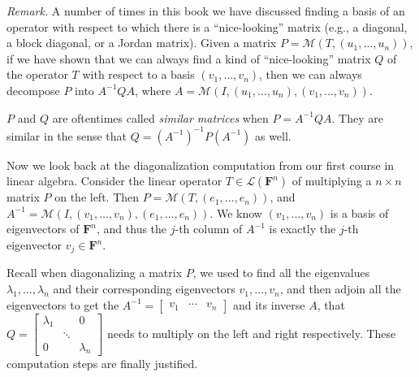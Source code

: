 \documentclass[11pt]{article}
\newcommand{\rmk}{\noindent\textit{Remark. }}
\newcommand{\df}[1]{\textit{\textsf{#1}}}
\newcommand{\F}{\mathbf{F}}
\newcommand{\M}{\mathcal{M}}
\begin{document}
    \rmk A number of times in this book we have discussed finding a basis of an operator with respect to which there is a ``nice-looking'' matrix (e.g., a diagonal, a block diagonal, or a Jordan matrix). Given a matrix $P = \M(T,(u_1,\dots,u_n))$, if we have shown that we can always find a kind of ``nice-looking'' matrix $Q$ of the operator $T$ with respect to a basis $(v_1,\dots,v_n)$, then we can always decompose $P$ into $A^{-1}QA$, where $A = \M(I,(u_1,\dots,u_n),(v_1,\dots,v_n))$.

    $P$ and $Q$ are oftentimes called \df{similar matrices} when $P = A^{-1} Q A$. They are similar in the sense that $Q = (A^{-1})^{-1} P (A^{-1})$ as well.

    Now we look back at the diagonalization computation from our first course in linear algebra. Consider the linear operator $T \in \mathcal{L}(\F^n)$ of multiplying a $n\times n$ matrix $P$ on the left. Then $P = \M(T,(e_1,\dots,e_n))$, and $A^{-1} = \M(I,(v_1,\dots,v_n),(e_1,\dots,e_n))$. We know $(v_1,\dots,v_n)$ is a basis of eigenvectors of $\F^n$, and thus the $j$-th column of $A^{-1}$ is exactly the $j$-th eigenvector $v_j \in \F^n$.
    
    Recall when diagonalizing a matrix $P$, we used to find all the eigenvalues $\lambda_1,\dots,\lambda_n$ and their corresponding eigenvectors $v_1,\dots,v_n$, and then adjoin all the eigenvectors to get the $A^{-1} = \begin{bmatrix} v_1 & \cdots & v_n \end{bmatrix}$ and its inverse $A$, that $Q = \begin{bmatrix}
    \lambda_1 & & 0 \\
    & \ddots & \\
    0 & & \lambda_n
    \end{bmatrix}$ needs to multiply on the left and right respectively. These computation steps are finally justified.
\end{document}

